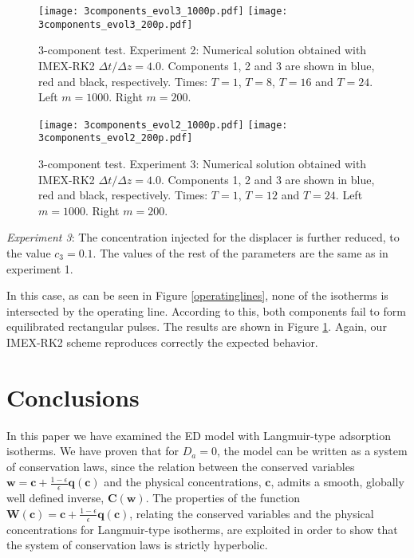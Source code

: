 \documentclass[preprint]{elsarticle}
\theoremstyle{definition}
\newcommand{\bw}{\boldsymbol w}
\newcommand{\bW}{\boldsymbol W}
\newcommand{\bc}{\boldsymbol c}
\newcommand{\bC}{\boldsymbol C}
\newcommand{\bq}{\boldsymbol q}
\begin{document}
\begin{figure}[ht]   
\begin{center} 
\texttt{[image: 3components\_evol3\_1000p.pdf]}
\texttt{[image: 3components\_evol3\_200p.pdf]}
\end{center}   
\caption{3-component test. Experiment 2: Numerical solution obtained
  with IMEX-RK2 $ \Delta t/\Delta z=4.0$.  Components 1, 2 and 3
  are shown in blue, red and black, respectively. Times: $T=1$, $T=8$,
  $T=16$ and $T=24$. Left $m=1000$. Right $m=200$.}   
\label{comp3disperso2}  
\end{figure} 
 


\begin{figure}[ht]   
\begin{center} 
\texttt{[image: 3components\_evol2\_1000p.pdf]}
\texttt{[image: 3components\_evol2\_200p.pdf]}
\end{center}   
\caption{3-component test. Experiment 3: Numerical solution obtained
  with IMEX-RK2 $ \Delta t/\Delta z=4.0$.  Components 1, 2 and 3
  are shown in blue, red and black, respectively. Times: $T=1$, $T=12$ and $T=24$. Left $m=1000$. Right $m=200$.}   
\label{comp3disperso3}  
\end{figure} 


{\em Experiment 3}: The concentration injected for the displacer is
further reduced, to the
value $c_3=0.1$. The values of the rest of the parameters are the same
as in experiment 1. 

In this case, as can be seen in Figure \ref{operatinglines}, none of the isotherms is intersected by the operating line. According to this, both components fail to form equilibrated rectangular pulses. 
The results are shown in Figure \ref{comp3disperso2}. Again, our IMEX-RK2 scheme reproduces correctly the expected behavior.




 
  
 
\section{Conclusions} \label{sec:conc}

In this paper we have examined the ED model with Langmuir-type
adsorption isotherms. We have proven that for $D_a=0$, the model can be
written as a system of conservation laws, since  the relation between
the conserved 
variables $\bw= \bc+\frac{1-\epsilon}{\epsilon}\bq(\bc)$ and the
physical concentrations, $\bc$, admits a smooth, globally well defined
inverse, $\bC(\bw)$. The properties of the function
$\bW(\bc)=\bc+\frac{1-\epsilon}{\epsilon}\bq(\bc)$,  relating the
conserved variables 
and the physical concentrations for Langmuir-type isotherms, are
exploited in order to show that the system of conservation laws is
strictly hyperbolic. 
\end{document}
